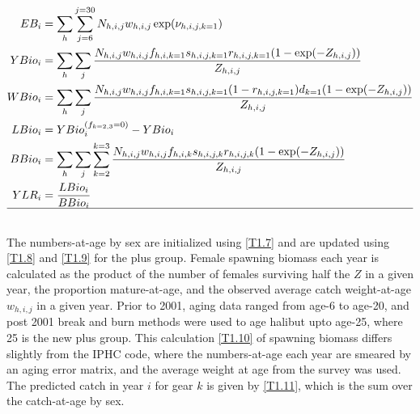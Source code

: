 \begin{table}
\begin{center}
\begin{align}
			EB_{i} &= \sum_h \sum_{j=6}^{j=30} N_{h,i,j} w_{h,i,j} \exp(\nu_{h,i,j,k=1}) \label{T1.12}\\
			YBio_i &= \sum_h \sum_j \frac{N_{h,i,j}w_{h,i,j}f_{h,i,k=1}s_{h,i,j,k=1} r_{h,i,j,k=1}(1-\exp(-Z_{h,i,j}))}
			{Z_{h,i,j}}\label{T1.13}\\
			WBio_i &= \sum_h \sum_j
			\frac{N_{h,i,j}w_{h,i,j}f_{h,i,k=1}s_{h,i,j,k=1}(1-r_{h,i,j,k=1})d_{k=1}(1-\exp(-Z_{h,i,j}))}
			{Z_{h,i,j}} \label{T1.14}\\
			LBio_i &= YBio_i^{(f_{k=2,3}=0)} - YBio_i \label{T1.15}\\
			BBio_i &= \sum_h \sum_j \sum_{k=2}^{k=3}
			\frac{N_{h,i,j}w_{h,i,j}f_{h,i,k}s_{h,i,j,k} r_{h,i,j,k}(1-\exp(-Z_{h,i,j}))}
			{Z_{h,i,j}}\label{T1.16}\\
			YLR_i & = \frac{LBio_i}{BBio_i}\label{T1.17}\\
			\hline \nonumber
		\end{align}
		\normalEq
	\end{center}
\end{table}

The numbers-at-age by sex are initialized using \eqref{T1.7} and are updated using \eqref{T1.8} and \eqref{T1.9} for the plus group.  Female spawning biomass each year is calculated as the product of the number of females surviving half the $Z$ in a given year, the proportion mature-at-age, and the observed average catch weight-at-age $w_{h,i,j}$ in a given year.  Prior to 2001, aging data ranged from age-6 to age-20, and post 2001 break and burn methods were used to age halibut upto age-25, where 25 is the new plus group.  This calculation \eqref{T1.10} of spawning biomass differs slightly from the IPHC code, where the numbers-at-age each year are smeared by an aging error matrix, and the average weight at age from the survey was used. The predicted catch in year $i$ for gear $k$ is given by \eqref{T1.11}, which is the sum over the catch-at-age by sex.

